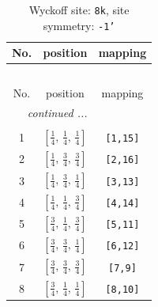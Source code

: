 \documentclass[fleqn,8pt]{jsarticle}
\begin{document}
\renewcommand{\arraystretch}{1.2}
\begin{longtable}{ccc}
\caption{Wyckoff site: {\tt 8k}, site symmetry: {\tt -1'}}
 \\
 \hline \hline
No. & position & mapping \\ \hline \endfirsthead

\multicolumn{2}{l}{\tablename\ \thetable{}} \\
 \hline \hline
No. & position & mapping \\ \hline \endhead

 \hline \hline
\multicolumn{2}{r}{\footnotesize\it continued ...} \\ \endfoot

 \hline \hline
\multicolumn{2}{r}{} \\ \endlastfoot

1 & $\left[ \frac{1}{4},\, \frac{1}{4},\, \frac{1}{4} \right]$ & {\tt [1,15]} \\ \hline
2 & $\left[ \frac{1}{4},\, \frac{3}{4},\, \frac{3}{4} \right]$ & {\tt [2,16]} \\ \hline
3 & $\left[ \frac{1}{4},\, \frac{3}{4},\, \frac{1}{4} \right]$ & {\tt [3,13]} \\ \hline
4 & $\left[ \frac{1}{4},\, \frac{1}{4},\, \frac{3}{4} \right]$ & {\tt [4,14]} \\ \hline
5 & $\left[ \frac{3}{4},\, \frac{1}{4},\, \frac{3}{4} \right]$ & {\tt [5,11]} \\ \hline
6 & $\left[ \frac{3}{4},\, \frac{3}{4},\, \frac{1}{4} \right]$ & {\tt [6,12]} \\ \hline
7 & $\left[ \frac{3}{4},\, \frac{3}{4},\, \frac{3}{4} \right]$ & {\tt [7,9]} \\ \hline
8 & $\left[ \frac{3}{4},\, \frac{1}{4},\, \frac{1}{4} \right]$ & {\tt [8,10]} \\
\end{longtable}
\renewcommand{\arraystretch}{1.2}
\end{document}

